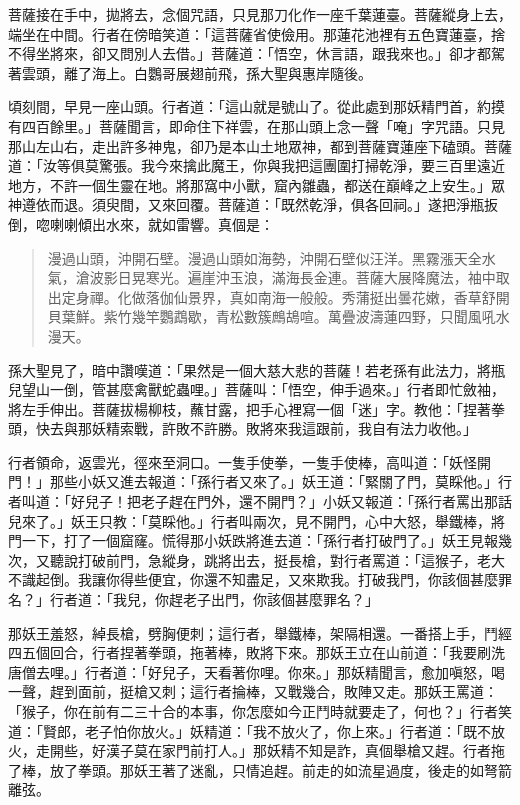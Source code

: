 菩薩接在手中，拋將去，念個咒語，只見那刀化作一座千葉蓮臺。菩薩縱身上去，端坐在中間。行者在傍暗笑道：「這菩薩省使儉用。那蓮花池裡有五色寶蓮臺，捨不得坐將來，卻又問別人去借。」菩薩道：「悟空，休言語，跟我來也。」卻才都駕著雲頭，離了海上。白鸚哥展翅前飛，孫大聖與惠岸隨後。

頃刻間，早見一座山頭。行者道：「這山就是號山了。從此處到那妖精門首，約摸有四百餘里。」菩薩聞言，即命住下祥雲，在那山頭上念一聲「唵」字咒語。只見那山左山右，走出許多神鬼，卻乃是本山土地眾神，都到菩薩寶蓮座下磕頭。菩薩道：「汝等俱莫驚張。我今來擒此魔王，你與我把這團圍打掃乾淨，要三百里遠近地方，不許一個生靈在地。將那窩中小獸，窟內雛蟲，都送在巔峰之上安生。」眾神遵依而退。須臾間，又來回覆。菩薩道：「既然乾淨，俱各回祠。」遂把淨瓶扳倒，唿喇喇傾出水來，就如雷響。真個是：
\begin{quote}
漫過山頭，沖開石壁。漫過山頭如海勢，沖開石壁似汪洋。黑霧漲天全水氣，滄波影日晃寒光。遍崖沖玉浪，滿海長金連。菩薩大展降魔法，袖中取出定身禪。化做落伽仙景界，真如南海一般般。秀蒲挺出曇花嫩，香草舒開貝葉鮮。紫竹幾竿鸚鵡歇，青松數簇鷓鴣喧。萬疊波濤蓮四野，只聞風吼水漫天。
\end{quote}

孫大聖見了，暗中讚嘆道：「果然是一個大慈大悲的菩薩！若老孫有此法力，將瓶兒望山一倒，管甚麼禽獸蛇蟲哩。」菩薩叫：「悟空，伸手過來。」行者即忙斂袖，將左手伸出。菩薩拔楊柳枝，蘸甘露，把手心裡寫一個「迷」字。教他：「捏著拳頭，快去與那妖精索戰，許敗不許勝。敗將來我這跟前，我自有法力收他。」

行者領命，返雲光，徑來至洞口。一隻手使拳，一隻手使棒，高叫道：「妖怪開門！」那些小妖又進去報道：「孫行者又來了。」妖王道：「緊關了門，莫睬他。」行者叫道：「好兒子！把老子趕在門外，還不開門？」小妖又報道：「孫行者罵出那話兒來了。」妖王只教：「莫睬他。」行者叫兩次，見不開門，心中大怒，舉鐵棒，將門一下，打了一個窟窿。慌得那小妖跌將進去道：「孫行者打破門了。」妖王見報幾次，又聽說打破前門，急縱身，跳將出去，挺長槍，對行者罵道：「這猴子，老大不識起倒。我讓你得些便宜，你還不知盡足，又來欺我。打破我門，你該個甚麼罪名？」行者道：「我兒，你趕老子出門，你該個甚麼罪名？」

那妖王羞怒，綽長槍，劈胸便刺；這行者，舉鐵棒，架隔相還。一番搭上手，鬥經四五個回合，行者捏著拳頭，拖著棒，敗將下來。那妖王立在山前道：「我要刷洗唐僧去哩。」行者道：「好兒子，天看著你哩。你來。」那妖精聞言，愈加嗔怒，喝一聲，趕到面前，挺槍又刺；這行者掄棒，又戰幾合，敗陣又走。那妖王罵道：「猴子，你在前有二三十合的本事，你怎麼如今正鬥時就要走了，何也？」行者笑道：「賢郎，老子怕你放火。」妖精道：「我不放火了，你上來。」行者道：「既不放火，走開些，好漢子莫在家門前打人。」那妖精不知是詐，真個舉槍又趕。行者拖了棒，放了拳頭。那妖王著了迷亂，只情追趕。前走的如流星過度，後走的如弩箭離弦。

